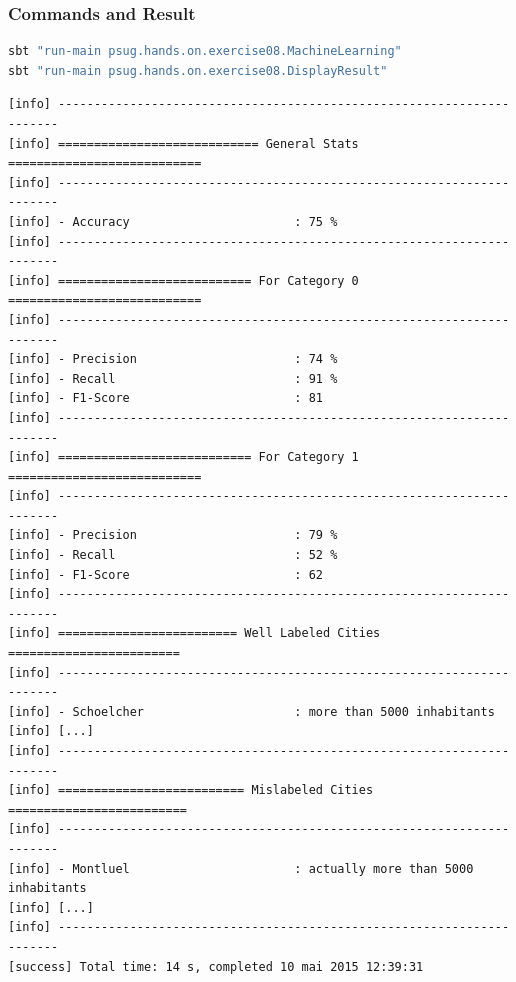 \documentclass[slidetop,9pt,utf8]{beamer}
\begin{document}
\begin{frame}[fragile]

  \frametitle{Commands and Result}
     
  \begin{lstlisting}[language=bash, style=terminal-medium]
sbt "run-main psug.hands.on.exercise08.MachineLearning"
sbt "run-main psug.hands.on.exercise08.DisplayResult"    
  \end{lstlisting}

  \begin{lstlisting}[style=terminal]
[info] ----------------------------------------------------------------------
[info] ============================ General Stats ===========================
[info] ----------------------------------------------------------------------
[info] - Accuracy                       : 75 %
[info] ----------------------------------------------------------------------
[info] =========================== For Category 0 ===========================
[info] ----------------------------------------------------------------------
[info] - Precision                      : 74 %
[info] - Recall                         : 91 %
[info] - F1-Score                       : 81
[info] ----------------------------------------------------------------------
[info] =========================== For Category 1 ===========================
[info] ----------------------------------------------------------------------
[info] - Precision                      : 79 %
[info] - Recall                         : 52 %
[info] - F1-Score                       : 62
[info] ----------------------------------------------------------------------
[info] ========================= Well Labeled Cities ========================
[info] ----------------------------------------------------------------------
[info] - Schoelcher                     : more than 5000 inhabitants
[info] [...]
[info] ----------------------------------------------------------------------
[info] ========================== Mislabeled Cities =========================
[info] ----------------------------------------------------------------------
[info] - Montluel                       : actually more than 5000 inhabitants
[info] [...]
[info] ----------------------------------------------------------------------
[success] Total time: 14 s, completed 10 mai 2015 12:39:31
  \end{lstlisting}

\end{frame}

%
%
%
%
\end{document}
